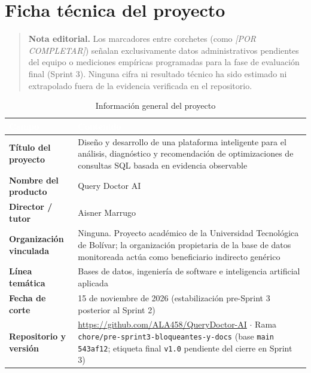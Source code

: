 \documentclass[12pt,a4paper]{article}
\begin{document}
\tableofcontents
\newpage
\listoftables
\listoffigures
\newpage

\section*{Ficha técnica del proyecto}

\begin{quote}
\textbf{Nota editorial.} Los marcadores entre corchetes (como \textit{[POR COMPLETAR]}) señalan exclusivamente datos administrativos pendientes del equipo o mediciones empíricas programadas para la fase de evaluación final (Sprint 3). Ninguna cifra ni resultado técnico ha sido estimado ni extrapolado fuera de la evidencia verificada en el repositorio.
\end{quote}

\begingroup
{}
\begin{table}[H]
\centering
\small
\begin{tabularx}{\textwidth}{>{\bfseries}p{} X}
\toprule
\rowcolor{utbblue}
\textcolor{white}{\textbf{Campo}} & \textcolor{white}{\textbf{Contenido}} \\
\midrule
Título del proyecto & Diseño y desarrollo de una plataforma inteligente para el análisis, diagnóstico y recomendación de optimizaciones de consultas SQL basada en evidencia observable \\
Nombre del producto & Query Doctor AI \\
Director / tutor & Aisner Marrugo \\
Organización vinculada & Ninguna. Proyecto académico de la Universidad Tecnológica de Bolívar; la organización propietaria de la base de datos monitoreada actúa como beneficiario indirecto genérico \\
Línea temática & Bases de datos, ingeniería de software e inteligencia artificial aplicada \\
Fecha de corte & 15 de noviembre de 2026 (estabilización pre-Sprint 3 posterior al Sprint 2) \\
Repositorio y versión & \url{https://github.com/ALA458/QueryDoctor-AI} $\cdot$ Rama \texttt{chore/pre-sprint3-bloqueantes-y-docs} (base \texttt{main} \texttt{543af12}; etiqueta final \texttt{v1.0} pendiente del cierre en Sprint 3) \\
\bottomrule
\end{tabularx}
\caption{Información general del proyecto}
\label{tab:ficha-proyecto}
\end{table}
\endgroup
\end{document}

